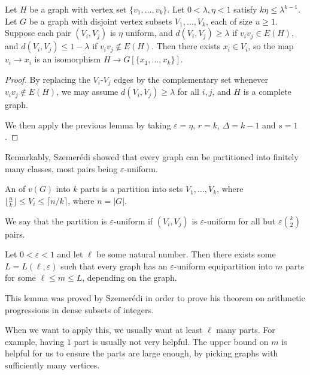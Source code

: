 \documentclass[a4paper]{article}
\begin{document}
\begin{cor}
  Let $H$ be a graph with vertex set $\{v_1, \ldots, v_k\}$. Let $0 < \lambda, \eta < 1$ satisfy $k \eta \leq \lambda^{k - 1}$. Let $G$ be a graph with disjoint vertex subsets $V_1, \ldots, V_k$, each of size $u \geq 1$. Suppose each pair $(V_i, V_j)$ is $\eta$ uniform, and $d(V_i, V_j) \geq \lambda$ if $v_i v_j \in E(H)$, and $d(V_i, V_j) \leq 1 - \lambda$ if $v_i v_j \not \in E(H)$. Then there exists $x_i \in V_i$, so the map $v_i \to x_i$ is an isomorphism $H \to G[\{x_1, \ldots, x_k\}]$.
\end{cor}

\begin{proof}
  By replacing the $V_i$-$V_j$ edges by the complementary set whenever $v_i v_j \not \in E(H)$, we may assume $d(V_i, V_j) \geq \lambda$ for all $i, j$, and $H$ is a complete graph.

  We then apply the previous lemma by taking $\varepsilon = \eta$, $r = k$, $\Delta = k- 1$ and $s = 1$.
\end{proof}

Remarkably, Szemer\'edi showed that every graph can be partitioned into finitely many classes, most pairs being $\varepsilon$-uniform.

An  of $v(G)$ into $k$ parts is a partition into sets $V_1, \ldots, V_k$, where $\lfloor \frac{n}{k} \rfloor \leq V_i \leq \lceil n/k\rceil$, where $n = |G|$.

We say that the partition is $\varepsilon$-uniform if $(V_i, V_j)$ is $\varepsilon$-uniform for all but $\varepsilon \binom{k}{2}$ pairs.

\begin{thm}
  Let $0 < \varepsilon < 1$ and let $\ell$ be some natural number. Then there exists some $L = L(\ell, \varepsilon)$ such that every graph has an $\varepsilon$-uniform equipartition into $m$ parts for some $\ell \leq m \leq L$, depending on the graph.
\end{thm}
This lemma was proved by Szemer\'edi in order to prove his theorem on arithmetic progressions in dense subsets of integers.

When we want to apply this, we usually want at least $\ell$ many parts. For example, having $1$ part is usually not very helpful. The upper bound on $m$ is helpful for us to ensure the parts are large enough, by picking graphs with sufficiently many vertices.
\end{document}
